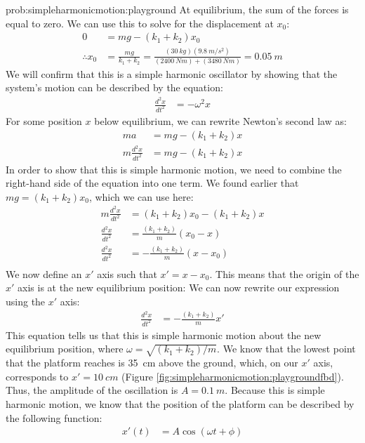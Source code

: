 \begin{solution}{prob:simpleharmonicmotion:playground}
At equilibrium, the sum of the forces is equal to zero. We can use this to solve for the displacement at $x_0$:
\begin{align*}
0&=mg-(k_1+k_2)x_0\\
\therefore x_0&=\frac{mg}{k_1+k_2}=\frac{(\SI{30}{kg})(\SI{9.8}{m/s^2})}{(\SI{2400}{Nm})+(\SI{3480}{Nm})}=\SI{0.05}{m}
\end{align*}
We will confirm that this is a simple harmonic oscillator by showing that the system's motion can be described by the equation:
\begin{align*}
\frac{d^2x}{dt^2}&=-\omega^2x
\end{align*}
For some position $x$ below equilibrium, we can rewrite Newton's second law as:
\begin{align*}
ma&=mg-(k_1+k_2)x\\
m\frac{d^2x}{dt^2}&=mg-(k_1+k_2)x
\end{align*}
In order to show that this is simple harmonic motion, we need to combine the right-hand side of the equation into one term. We found earlier that $mg=(k_1+k_2)x_0$, which we can use here:
\begin{align*}
m\frac{d^2x}{dt^2}&=(k_1+k_2)x_0-(k_1+k_2)x\\
\frac{d^2x}{dt^2}&=\frac{(k_1+k_2)}{m}(x_0-x)\\
\frac{d^2x}{dt^2}&=-\frac{(k_1+k_2)}{m}(x-x_0)\\
\end{align*}
We now define an $x'$ axis such that $x'=x-x_0$. This means that the origin of the $x'$ axis is at the new equilibrium position:
We can now rewrite our expression using the $x'$ axis:
\begin{align*}
\frac{d^2x}{dt^2}&=-\frac{(k_1+k_2)}{m}x'
\end{align*}
This equation tells us that this is simple harmonic motion about the new equilibrium position, where $\omega=\sqrt{(k_1+k_2)/m}$. We know that the lowest point that the platform reaches is \SI{35}{cm} above the ground, which, on our $x'$ axis, corresponds to $x'=\SI{10}{cm}$ (Figure \ref{fig:simpleharmonicmotion:playgroundfbd}). Thus, the amplitude of the oscillation is $A=\SI{0.1}{m}$. Because this is simple harmonic motion, we know that the position of the platform can be described by the following function:
\begin{align*}
x'(t)&= A \cos(\omega t + \phi)

\end{align*}
\end{solution}
